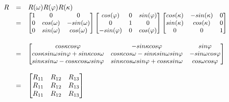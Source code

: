 \begin{equation}
  \begin{array}{lll}
    R & = & R(\omega) R(\varphi) R(\kappa) \\
    & = &
      \begin{small}
      \left[ 
        \begin{matrix} 
          1 & 0           & 0 \\
          0 & cos(\omega) & -sin(\omega) \\
          0 & sin(\omega) & cos(\omega)
        \end{matrix} 
      \right] 
      \left[ 
        \begin{matrix} 
          cos(\varphi)  & 0 & sin(\varphi) \\
          0             & 1 & 0 \\
          -sin(\varphi) & 0 & cos(\varphi)
        \end{matrix} 
      \right] 
      \left[ 
        \begin{matrix} 
          cos(\kappa) & -sin(\kappa) & 0 \\
          sin(\kappa) & cos(\kappa)  & 0 \\
          0           & 0            & 1
        \end{matrix} 
      \right] 
      \end{small} \\ \\
    & = &
      \begin{small}
        \left[ 
          \begin{matrix} 
            cos \kappa cos \varphi  
              & -sin \kappa cos \varphi  
              & sin \varphi  \\
        
            cos \kappa sin \omega sin \varphi  + sin \kappa cos \omega 
              & cos \kappa cos \omega  - sin \kappa sin \omega sin \varphi 
              & -sin \omega cos \varphi  \\
        
            sin \kappa sin \omega  - cos \kappa cos \omega sin \varphi 
              & sin \kappa cos \omega sin \varphi  + cos \kappa sin \omega  
              & cos \omega cos \varphi 
          \end{matrix} 
        \right] 
      \end{small} \\ \\
    & = &
      \begin{bmatrix}
        R_{11} & R_{12} & R_{13} \\
        R_{11} & R_{12} & R_{13} \\
        R_{11} & R_{12} & R_{13} \\
      \end{bmatrix}
  \end{array}
  \label{eq:idp2}
\end{equation}